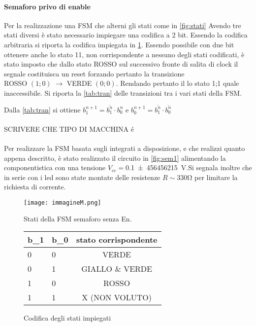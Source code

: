
\paragraph{Semaforo privo di enable}
Per la realizzazione una FSM che alterni gli stati come in \figurename{\ref{fig:stati}}
Avendo tre stati diversi è stato necessario impiegare una codifica a 2 bit.
Essendo la codifica arbitraria si riporta la codifica impiegata in
\tablename{\ref{tab:cod}}.
Essendo possibile con due bit ottenere anche lo stato 11,  non corrispondente a nessuno degli stati codificati,
è stato imposto che dallo stato ROSSO sul successivo fronte di salita di clock il segnale costituisca
un reset forzando pertanto la transizione \\ROSSO $(1;0)$  $\longrightarrow$ VERDE $(0;0)$.
Rendando pertanto il lo stato 1;1 quale inaccessibile.
Si riporta la \tablename{ \ref{tab:tran}} delle transizioni tra i vari stati della FSM.

Dalla \tablename{ \ref{tab:tran}} si ottiene  $b_{1}^{n+1} = \overline{b_{1}^{n}} \cdot b_{0}^{n}$ e $b_{0}^{n+1} = \overline{b_{1}^{n}} \cdot \overline{b_{0}^{n}}$
\\
\\
SCRIVERE CHE TIPO DI MACCHINA é
\\
\\
Per realizzare la FSM basata sugli integrati a disposizione, e che realizzi quanto appena descritto,
 è stato realizzato il circuito in \figurename{ \ref{fig:sem1}} alimentando la componentistica con una tensione
 $V_{cc}=$\SI{0.1 \pm 456456215}{\volt}.Si segnala inoltre che in serie con i led sono state montate delle resistenze $R\sim 330$\si{\ohm} per limitare la richiesta di corrente.
\begin{figure}[h!]
	\begin{minipage}{0.5\textwidth}
		\centering
		\texttt{[image: immagineM.png]}
		\caption{Stati della FSM semaforo senza En.}
		\label{fig:stati}
	\end{minipage}
\begin{minipage}{0.5\textwidth}
	\centering
	\begin{tabular}{ssc}
	\toprule
	b_{1} & b_{0} & stato corrispondente\\
	 & 0 & VERDE\\
	0 & 1 & GIALLO \& VERDE\\
	1 & 0 & ROSSO\\
	1 & 1 &  X (NON VOLUTO)\\
	\bottomrule
	\end{tabular}
	\caption{Codifica degli stati impiegati}
	\label{tab:cod}
\end{minipage}
\end{figure}


